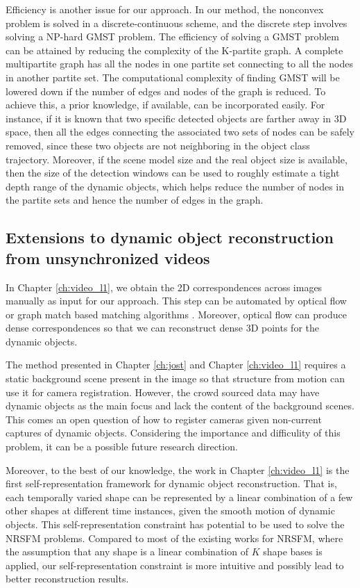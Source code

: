 Efficiency is another issue for our approach. In our method, the nonconvex problem is solved in a discrete-continuous scheme, and the discrete step involves solving a NP-hard GMST problem. The efficiency of solving a GMST problem can be attained by reducing the complexity of the K-partite graph. A complete multipartite graph has all the nodes in one partite set connecting to all the nodes in another partite set. The computational complexity of finding GMST will be lowered down if the number of edges and nodes of the graph is reduced. 
To achieve this, a prior knowledge, if available, can be incorporated easily. 
For instance, if it is known that two specific detected objects are farther away in 3D space, then all the edges connecting the associated two sets of nodes can be safely removed, since these two objects are not neighboring in the object class trajectory. Moreover, if the scene model size and the real object size is available, then the size of the detection windows can be used to roughly estimate a tight depth range of the dynamic objects, which helps reduce the number of nodes in the partite sets and hence the number of edges in the graph.

\subsection{Extensions to dynamic object reconstruction from unsynchronized videos}

In Chapter \ref{ch:video_l1}, we obtain the 2D correspondences across images manually as input for our approach. 
This step can be automated by optical flow \cite{brox2004high} or graph match based matching algorithms \cite{yan2015multi,Yan_2015_CVPR}. Moreover, optical flow can produce dense correspondences so that we can reconstruct dense 3D points for the dynamic objects. 

The method presented in Chapter \ref{ch:jost} and Chapter \ref{ch:video_l1} requires a static background scene present in the image so that structure from motion can use it for camera registration. However, the crowd sourced data may have dynamic objects as the main focus and lack the content of the background scenes. This comes an open question of how to register cameras given non-current captures of dynamic objects. Considering the importance and difficulity of this problem, it can be a possible future research direction.

Moreover, to the best of our knowledge, the work in Chapter \ref{ch:video_l1} is the first self-representation framework for dynamic object reconstruction. That is, each temporally varied shape can be represented by a linear combination of a few other shapes at different time instances, given the smooth motion of dynamic objects. This self-representation constraint has potential to be used to solve the NRSFM problems. Compared to most of the existing works for NRSFM, where the assumption that any shape is a linear combination of $K$ shape bases is applied, our self-representation constraint is more intuitive and possibly lead to better reconstruction results.
